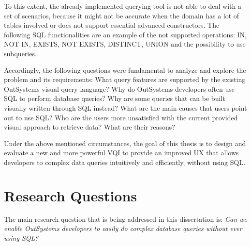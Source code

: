 To this extent, the already implemented querying tool is not able to deal with a set of scenarios, because it might not be accurate when the domain has a lot of tables involved or does not support essential advanced constructors. The following \gls{SQL} functionalities are an example of the not supported operations: IN, NOT IN, EXISTS, NOT EXISTS, DISTINCT, UNION and the possibility to use subqueries.

Accordingly, the following questions were fundamental to analyze and explore the problem and its requirements: What query features are supported by the existing OutSystems visual query language? Why do OutSystems developers often use \gls{SQL} to perform database queries? Why are some queries that can be built visually written through \gls{SQL} instead? What are the main causes that users point out to use \gls{SQL}? Who are the users more unsatisfied with the current provided visual approach to retrieve data? What are their reasons?


Under the above mentioned circumstances, the goal of this thesis is to design and evaluate a new and more powerful \gls{VQI} to provide an improved \gls{UX} that allows developers to complex data queries intuitively and efficiently, without using \gls{SQL}.

\section{Research Questions}
\label{sec:research_questions}
The main research question that is being addressed in this dissertation is: \textit{Can we enable OutSystems developers to easily do complex database queries without ever using \gls{SQL}?}


